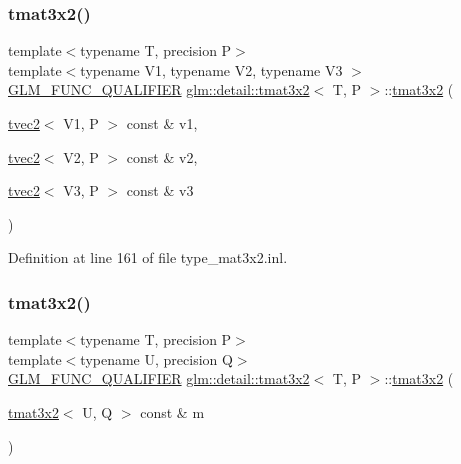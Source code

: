 \subsubsection{\texorpdfstring{tmat3x2()}{tmat3x2()}\hspace{0.1cm}{\footnotesize\ttfamily [21/22]}}
{\footnotesize\ttfamily template$<$typename T, precision P$>$ \\
template$<$typename V1, typename V2, typename V3 $>$ \\
\hyperlink{setup_8hpp_a33fdea6f91c5f834105f7415e2a64407}{G\+L\+M\+\_\+\+F\+U\+N\+C\+\_\+\+Q\+U\+A\+L\+I\+F\+I\+ER} \hyperlink{structglm_1_1detail_1_1tmat3x2}{glm\+::detail\+::tmat3x2}$<$ T, P $>$\+::\hyperlink{structglm_1_1detail_1_1tmat3x2}{tmat3x2} (\begin{DoxyParamCaption}\item[{\hyperlink{structglm_1_1detail_1_1tvec2}{tvec2}$<$ V1, P $>$ const \&}]{v1,  }\item[{\hyperlink{structglm_1_1detail_1_1tvec2}{tvec2}$<$ V2, P $>$ const \&}]{v2,  }\item[{\hyperlink{structglm_1_1detail_1_1tvec2}{tvec2}$<$ V3, P $>$ const \&}]{v3 }\end{DoxyParamCaption})}



Definition at line 161 of file type\+\_\+mat3x2.\+inl.

\mbox{\label{structglm_1_1detail_1_1tmat3x2_a81e00e89a4ebf83f1b74bbbc79f5f795}} 
\subsubsection{\texorpdfstring{tmat3x2()}{tmat3x2()}\hspace{0.1cm}{\footnotesize\ttfamily [22/22]}}
{\footnotesize\ttfamily template$<$typename T, precision P$>$ \\
template$<$typename U, precision Q$>$ \\
\hyperlink{setup_8hpp_a33fdea6f91c5f834105f7415e2a64407}{G\+L\+M\+\_\+\+F\+U\+N\+C\+\_\+\+Q\+U\+A\+L\+I\+F\+I\+ER} \hyperlink{structglm_1_1detail_1_1tmat3x2}{glm\+::detail\+::tmat3x2}$<$ T, P $>$\+::\hyperlink{structglm_1_1detail_1_1tmat3x2}{tmat3x2} (\begin{DoxyParamCaption}\item[{\hyperlink{structglm_1_1detail_1_1tmat3x2}{tmat3x2}$<$ U, Q $>$ const \&}]{m }\end{DoxyParamCaption})}



